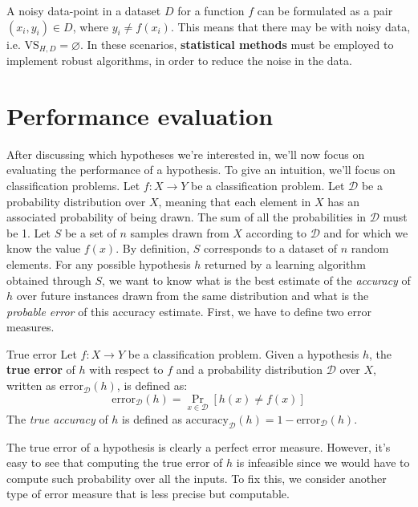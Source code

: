 \documentclass[a4paper, 12pt]{report}
\begin{document}
    A noisy data-point in a dataset $D$ for a function $f$ can be formulated as a pair $(x_i, y_i) \in D$, where $y_i \neq f(x_i)$. This means that there may be  with noisy data, i.e. $\mathrm{VS}_{H, D} = \varnothing$. In these scenarios, \textbf{statistical methods} must be employed to implement robust algorithms, in order to reduce the noise in the data.

    \section{Performance evaluation}

    After discussing which hypotheses we're interested in, we'll now focus on evaluating the performance of a hypothesis. To give an intuition, we'll focus on classification problems. Let $f : X \to Y$ be a classification problem. Let $\mathcal{D}$ be a probability distribution over $X$, meaning that each element in $X$ has an associated probability of being drawn. The sum of all the probabilities in $\mathcal{D}$ must be 1. Let $S$ be a set of $n$ samples drawn from $X$ according to $\mathcal{D}$ and for which we know the value $f(x)$. By definition, $S$ corresponds to a dataset of $n$ random elements. For any possible hypothesis $h$ returned by a learning algorithm obtained through $S$, we want to know what is the best estimate of the \textit{accuracy} of $h$ over future instances drawn from the same distribution and what is the \textit{probable error} of this accuracy estimate. First, we have to define two error measures.

    \begin{frameddefn}{True error}
        Let $f : X \to Y$ be a classification problem. Given a hypothesis $h$, the \textbf{true error} of $h$ with respect to $f$ and a probability distribution $\mathcal{D}$ over $X$, written as $\mathrm{error}_\mathcal{D}(h)$, is defined as:
        \[\mathrm{error}_\mathcal{D}(h) = \Pr_{x \in \mathcal{D}}[h(x) \neq f(x)]\]
        The \textit{true accuracy} of $h$ is defined as $\mathrm{accuracy}_\mathcal{D}(h) = 1-\mathrm{error}_{\mathcal{D}}(h)$.
    \end{frameddefn}

    The true error of a hypothesis is clearly a perfect error measure. However, it's easy to see that computing the true error of $h$ is infeasible since we would have to compute such probability over all the inputs. To fix this, we consider another type of error measure that is less precise but computable.
\end{document}
